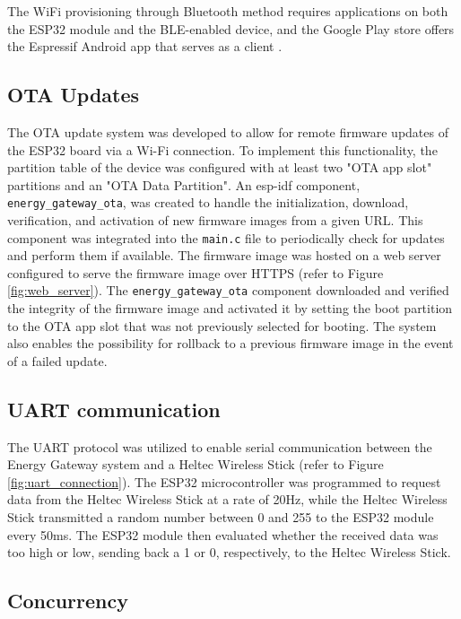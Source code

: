 The WiFi provisioning through Bluetooth method requires applications on both the ESP32 module and the BLE-enabled device, and the Google Play store offers the Espressif Android app that serves as a client \cite{google-play:esp-ble-provisioning}.

\subsection{OTA Updates}

The OTA update system was developed to allow for remote firmware updates of the ESP32 board via a Wi-Fi connection. To implement this functionality, the partition table of the device was configured with at least two "OTA app slot" partitions and an "OTA Data Partition". An esp-idf component, \texttt{energy\_gateway\_ota}, was created to handle the initialization, download, verification, and activation of new firmware images from a given URL. This component was integrated into the \texttt{main.c} file to periodically check for updates and perform them if available. The firmware image was hosted on a web server configured to serve the firmware image over HTTPS (refer to Figure \ref{fig:web_server}). The \texttt{energy\_gateway\_ota} component downloaded and verified the integrity of the firmware image and activated it by setting the boot partition to the OTA app slot that was not previously selected for booting. The system also enables the possibility for rollback to a previous firmware image in the event of a failed update.

\subsection{UART communication}

The UART protocol was utilized to enable serial communication between the Energy Gateway system and a Heltec Wireless Stick (refer to Figure \ref{fig:uart_connection}). The ESP32 microcontroller was programmed to request data from the Heltec Wireless Stick at a rate of 20Hz, while the Heltec Wireless Stick transmitted a random number between 0 and 255 to the ESP32 module every 50ms. The ESP32 module then evaluated whether the received data was too high or low, sending back a 1 or 0, respectively, to the Heltec Wireless Stick.

\subsection{Concurrency}


